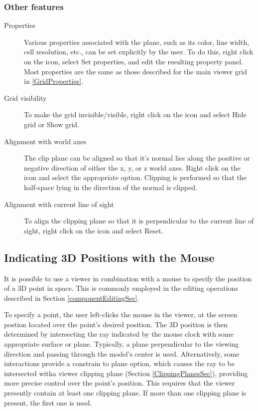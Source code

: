 \documentclass{article}
\begin{document}
\subsubsection{Other features}

\begin{description}

\item[Properties]\mbox{}

Various properties associated with the plane, such as its color, line
width, cell resolution, etc., can be set explicitly by the user. To do
this, right click on the icon, select {\sf Set properties}, and edit
the resulting property panel.  Most properties are the same as those
described for the main viewer grid in \ref{GridProperties}.

\item[Grid visibility]\mbox{}

To make the grid invisible/visible, right click on the icon
and select {\sf Hide grid} or {\sf Show grid}.

\item[Alignment with world axes]\mbox{}

The clip plane can be aligned so that it's
normal lies along the positive or negative direction of either the x,
y, or z world axes. Right click on the icon and select the
appropriate option. Clipping is performed so that
the half-space lying in the direction of the normal is clipped.

\item[Alignment with current line of sight]\mbox{}

To align the clipping plane so that it is perpendicular to the
current line of sight, right click on the icon and select {\sf Reset}.

\end{description}

\subsection{Indicating 3D Positions with the Mouse}
\label{indicatingPositionsSec}

It is possible to use a viewer in combination with a mouse to specify the
position of a 3D point in space. This is commonly employed in the
editing operations described in Section \ref{componentEditingSec}.

To specify a point, the user left-clicks the mouse in the viewer, at
the screen postion located over the point's desired position. The 3D
position is then determined by intersecting the ray indicated by the
mouse clock with some appropriate surface or plane. Typically, a plane
perpendicular to the viewing direction and passing through the model's
center is used. Alternatively, some interactions provide a {\sf constrain
to plane} option, which causes the ray to be intersected witha viewer
clipping plane (Section \ref{ClippingPlanesSec}), providing more precise control
over the point's position. This requires that the viewer presently
contain at least one clipping plane. If more than one clipping plane
is present, the first one is used.
\end{document}
